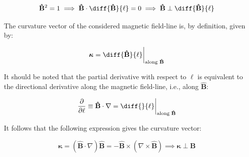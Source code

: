 \begin{equation}
    \mathbf{\hat{B}}^2=1\implies\mathbf{\hat{B}}\cdot\diff{\mathbf{\hat{B}}}{\ell}=0\implies\mathbf{\hat{B}}\perp\diff{\mathbf{\hat{B}}}{\ell}
\end{equation}

The curvature vector of the considered magnetic field-line is, by definition, given by:

\begin{equation}
    \boldsymbol{\kappa}=\diff{\mathbf{\hat{B}}}{\ell}\biggr|_{\text{along }\mathbf{\hat{B}}}
\end{equation}

It should be noted that the partial derivative with respect to $\ell$ is equivalent to the directional derivative along the magnetic field-line, i.e., along $\mathbf{\hat{B}}$:

\begin{equation}
    \frac{\partial}{\partial\ell}\equiv\mathbf{\hat{B}}\cdot\nabla=\diff{}{\ell}\biggr|_{\text{along }\mathbf{\hat{B}}}
\end{equation}

It follows that the following expression gives the curvature vector:

\begin{equation}
    \boldsymbol{\kappa}=(\mathbf{\hat{B}}\cdot\nabla)\mathbf{\hat{B}}=-\mathbf{\hat{B}}\times(\nabla\times\mathbf{\hat{B}})\implies\boldsymbol{\kappa}\perp\mathbf{B}
\end{equation}

